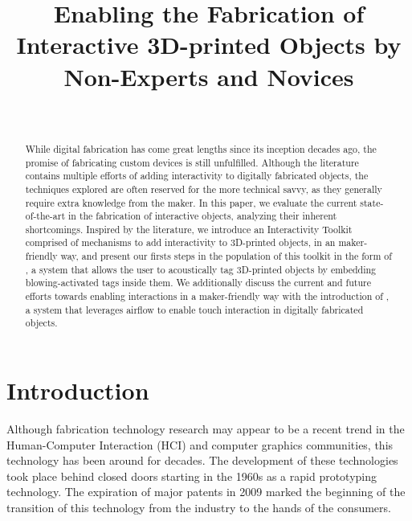 


  \title{Enabling the Fabrication of Interactive 3D-printed Objects by
    Non-Experts and Novices}
  \author{%
    \\
  }

  \maketitle

  \begin{abstract}
    While digital fabrication has come great lengths since its inception
    decades ago, the promise of fabricating custom devices is still
    unfulfilled. Although the literature contains multiple efforts of adding
    interactivity to digitally fabricated objects, the techniques explored are
    often reserved for the more technical savvy, as they generally require
    extra knowledge from the maker. In this paper, we evaluate the current
    state-of-the-art in the fabrication of interactive objects, analyzing their
    inherent shortcomings. Inspired by the literature, we introduce an
    Interactivity Toolkit comprised of mechanisms to add interactivity to
    3D-printed objects, in an maker-friendly way, and present our firsts
    steps in the population of this toolkit in the form of \bh, a system
    that allows the user to acoustically tag 3D-printed objects by embedding
    blowing-activated tags inside them.  We additionally discuss the current
    and future efforts towards enabling interactions in a maker-friendly way
    with the introduction of \at, a system that leverages airflow to
    enable touch interaction in digitally fabricated objects.
  \end{abstract}

  \section{Introduction}    
    Although fabrication technology research may appear to be a recent trend in
    the Human-Computer Interaction (HCI) and computer graphics communities,
    this technology has been around for decades. The development of these
    technologies took place behind closed doors starting in the 1960s as a
    rapid prototyping technology. The expiration of major patents in 2009
    marked the beginning of the transition of this technology from the industry
    to the hands of the consumers.
    
